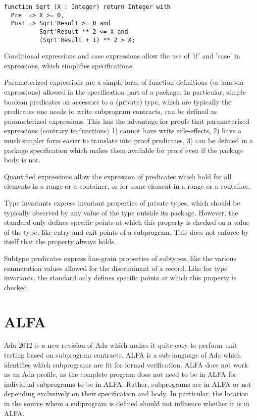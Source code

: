 \documentclass{article}
\begin{document}
\begin{verbatim}
function Sqrt (X : Integer) return Integer with
  Pre  => X >= 0,
  Post => Sqrt'Result >= 0 and 
          Sqrt'Result ** 2 <= X and
          (Sqrt'Result + 1) ** 2 > X;
\end{verbatim}

Conditional expressions and case expressions allow the use of 'if' and 'case'
in expressions, which simplifies specifications.

Parameterized expressions are a simple form of function definitions (or lambda
expressions) allowed in the specification part of a package. In particular,
simple boolean predicates on accessors to a (private) type, which are typically
the predicates one needs to write subprogram contracts, can be defined as
parameterized expressions. This has the advantage for proofs that parameterized
expressions (contrary to functions) 1) cannot have write side-effects, 2) have
a much simpler form easier to translate into proof predicates, 3) can be
defined in a package specification which makes them available for proof even if
the package body is not.

Quantified expressions allow the expression of predicates which hold for all
elements in a range or a container, or for some element in a range or a
container.

Type invariants express invariant properties of private types, which should be
typically observed by any value of the type outside its package. However, the
standard only defines specific points at which this property is checked on a
value of the type, like entry and exit points of a subprogram. This does not
enforce by itself that the property always holds.

Subtype predicates express fine-grain properties of subtypes, like the various
enumeration values allowed for the discriminant of a record. Like for type
invariants, the standard only defines specific points at which this property is
checked.

\section{ALFA}

Ada 2012 is a new revision of Ada which makes it quite easy to perform unit
testing based on subprogram contracts. ALFA is a sub-language of Ada which
identifies which subprograms are fit for formal verification. ALFA does not
work as an Ada profile, as the complete program does not need to be in ALFA for
individual subprograms to be in ALFA. Rather, subprograms are in ALFA or not
depending exclusively on their specification and body. In particular, the
location in the source where a subprogram is defined should not influence
whether it is in ALFA.
\end{document}

